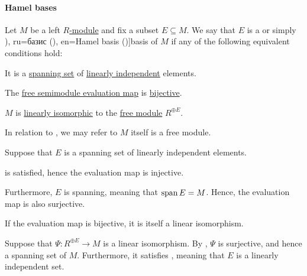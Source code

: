 \paragraph{Hamel bases}

\begin{definition}\label{def:hamel_basis}
  Let \( M \) be a left \hyperref[def:module]{\( R \)-module} and fix a subset \( E \subseteq M \). We say that \( E \) is a  or simply \term[bg=базис (\cite[100]{Обрешков1962ВисшаАлгебра}), ru=базис (\cite[\S 3.7]{Тыртышников2007ЛинейнаяАлгебра}), en=Hamel basis (\cite[example B-2.12]{Rotman2015AdvancedModernAlgebraPart1})]{basis} of \( M \) if any of the following equivalent conditions hold:

  \begin{thmenum}
     It is a \hyperref[thm:span_via_linear_combinations]{spanning set} of \hyperref[def:linear_dependence]{linearly independent} elements.

     The \hyperref[thm:free_semimodule_universal_property]{free semimodule evaluation map} is \hyperref[def:function_invertibility/bijective]{bijective}.

     \( M \) is \hyperref[def:linear_function]{linearly isomorphic} to the \hyperref[def:free_semimodule]{free module} \( R^{\oplus E} \).
  \end{thmenum}
\end{definition}
\begin{comments}
  \item In relation to , we may refer to \( M \) itself is a free module.
\end{comments}
\begin{defproof}
   Suppose that \( E \) is a spanning set of linearly independent elements.

   is satisfied, hence the evaluation map is injective.

  Furthermore, \( E \) is spanning, meaning that \( \operatorname{span} E = M \). Hence, the evaluation map is also surjective.

   If the evaluation map is bijective, it is itself a linear isomorphism.

   Suppose that \( \Psi: R^{\oplus E} \to M \) is a linear isomorphism. By , \( \Psi \) is surjective, and hence a spanning set of \( M \). Furthermore, it satisfies , meaning that \( E \) is a linearly independent set.
\end{defproof}

